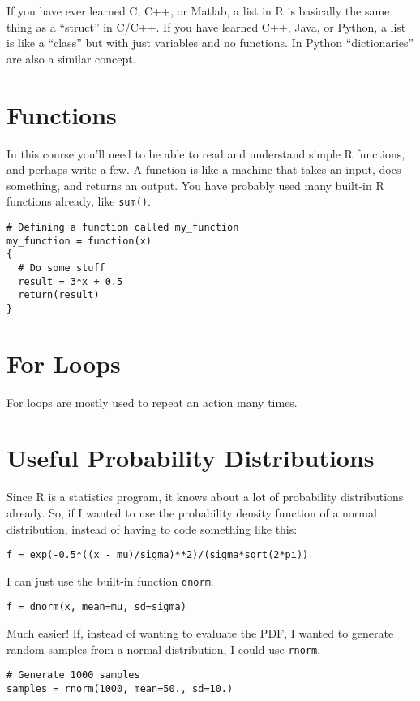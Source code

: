 If you have ever learned C, C++, or Matlab, a list in R is basically the same thing as
a ``struct'' in C/C++. If you have learned C++, Java, or Python, a list is
like a ``class'' but with just variables and no functions. In Python ``dictionaries''
are also a similar concept.

\section{Functions}
In this course you'll need to be able to read and understand simple R
functions, and perhaps write a few. A function is like a machine that takes
an input, does something, and returns an output. You have probably used many
built-in R functions already, like {\tt sum()}.

\begin{verbatim}
# Defining a function called my_function
my_function = function(x)
{
  # Do some stuff
  result = 3*x + 0.5
  return(result)
}
\end{verbatim}


\section{For Loops}
For loops are mostly used to repeat an action many times.

\section{Useful Probability Distributions}
Since R is a statistics program, it knows about a lot of probability
distributions already. So, if I wanted to use the probability density function
of a normal distribution, instead of having to code something like this:
\begin{verbatim}
f = exp(-0.5*((x - mu)/sigma)**2)/(sigma*sqrt(2*pi))
\end{verbatim}
I can just use the built-in function {\tt dnorm}.
\begin{verbatim}
f = dnorm(x, mean=mu, sd=sigma)
\end{verbatim}
Much easier! If, instead of wanting to evaluate the PDF, I wanted to generate
random samples from a normal distribution, I could use {\tt rnorm}.
\begin{verbatim}
# Generate 1000 samples
samples = rnorm(1000, mean=50., sd=10.)
\end{verbatim}

